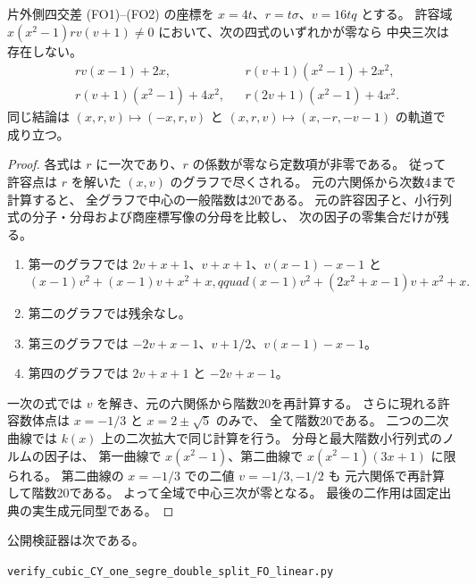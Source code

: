 \begin{proposition}\label{prop:cubic-CY-one-segre-double-split-FO-linear-excluded}
片外側四交差 (FO1)--(FO2) の座標を
$x=4t$、$r=t\sigma$、$v=16tq$ とする。
許容域 $x(x^2-1)r v(v+1)\ne0$ において、次の四式のいずれかが零なら
中央三次は存在しない。
\begin{align*}
 &rv(x-1)+2x, &&r(v+1)(x^2-1)+2x^2,\\
 &r(v+1)(x^2-1)+4x^2, &&r(2v+1)(x^2-1)+4x^2.
\end{align*}
同じ結論は $(x,r,v)\mapsto(-x,r,v)$ と
$(x,r,v)\mapsto(x,-r,-v-1)$ の軌道で成り立つ。
\end{proposition}
\begin{proof}
各式は $r$ に一次であり、$r$ の係数が零なら定数項が非零である。
従って許容点は $r$ を解いた $(x,v)$ のグラフで尽くされる。
元の六関係から次数4まで計算すると、
全グラフで中心の一般階数は20である。
元の許容因子と、小行列式の分子・分母および商座標写像の分母を比較し、
次の因子の零集合だけが残る。
\begin{enumerate}
\item 第一のグラフでは $2v+x+1$、$v+x+1$、$v(x-1)-x-1$ と
\[
 (x-1)v^2+(x-1)v+x^2+x,qquad
 (x-1)v^2+(2x^2+x-1)v+x^2+x .
\]
\item 第二のグラフでは残余なし。
\item 第三のグラフでは $-2v+x-1$、$v+1/2$、$v(x-1)-x-1$。
\item 第四のグラフでは $2v+x+1$ と $-2v+x-1$。
\end{enumerate}
一次の式では $v$ を解き、元の六関係から階数20を再計算する。
さらに現れる許容数体点は $x=-1/3$ と $x=2\pm\sqrt5$ のみで、
全て階数20である。
二つの二次曲線では $k(x)$ 上の二次拡大で同じ計算を行う。
分母と最大階数小行列式のノルムの因子は、
第一曲線で $x(x^2-1)$、第二曲線で $x(x^2-1)(3x+1)$ に限られる。
第二曲線の $x=-1/3$ での二値 $v=-1/3,-1/2$ も
元六関係で再計算して階数20である。
よって全域で中心三次が零となる。
最後の二作用は固定出典\cite{AS4CYpinned}の実生成元同型である。
\end{proof}

公開検証器は次である。
\par\noindent\texttt{verify\_cubic\_CY\_one\_segre\_double\_split\_FO\_linear.py}
\par

